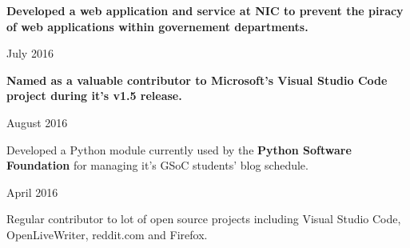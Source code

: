 
\begin{cvachievements}

\cvachievement%
  {%
    \begin{cvachievementitems}
      \item{\textbf{Developed a web application and service at NIC to prevent
            the piracy of web applications within governement departments.}} %
    \end{cvachievementitems}
  }
  {July 2016} %

\cvachievement%
  {%
    \begin{cvachievementitems}
      \item{\textbf{Named as a valuable contributor to Microsoft's Visual Studio
            Code project during it's v1.5 release.}} %
    \end{cvachievementitems}
  }
  {August 2016} %

\cvachievement%
  {%
    \begin{cvachievementitems}
      \item{Developed a Python module currently used by the \textbf{Python
            Software Foundation} for managing it's GSoC students'
            blog schedule.} %
    \end{cvachievementitems}
  }
  {April 2016} %

\cvachievement%
  {%
    \begin{cvachievementitems}
      \item{Regular contributor to lot of open source projects including Visual
            Studio Code, OpenLiveWriter, reddit.com and Firefox.} %
    \end{cvachievementitems}
  }
  {} %

\end{cvachievements}

